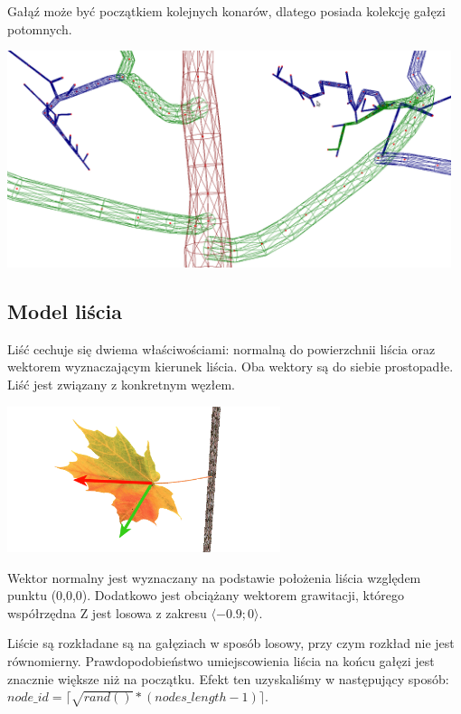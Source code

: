 Gałąź może być początkiem kolejnych konarów, dlatego posiada kolekcję gałęzi potomnych.

\begin{center}
	\includegraphics[width=130mm]{images/model/branching.png}
	\label{branching}
\end{center}
\subsection{Model liścia}
Liść cechuje się dwiema właściwościami: normalną do powierzchnii liścia oraz wektorem wyznaczającym kierunek liścia. Oba wektory są do siebie prostopadłe. Liść jest związany z konkretnym węzłem.

\begin{center}
	\includegraphics[width=80mm]{images/model/leaf_vects.png}
	\label{leaf_vect}
\end{center}

Wektor normalny jest wyznaczany na podstawie położenia liścia względem punktu (0,0,0). Dodatkowo jest obciążany wektorem grawitacji, którego współrzędna Z jest losowa z zakresu $\langle-0.9;0\rangle$. 



Liście są rozkładane są na gałęziach w sposób losowy, przy czym rozkład nie jest równomierny. Prawdopodobieństwo umiejscowienia liścia na końcu gałęzi jest znacznie większe niż na początku. Efekt ten uzyskaliśmy w następujący sposób: $node\_id = \lceil\sqrt{rand()}*(nodes\_length-1)\rceil$.

